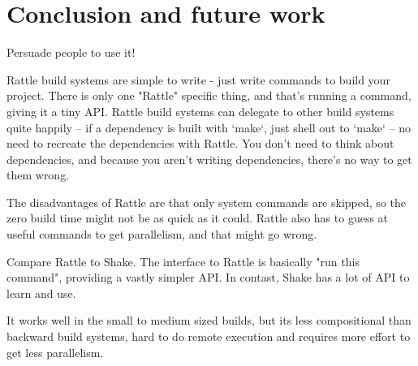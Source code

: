 \section{Conclusion and future work}
\label{sec:conclusion}

Persuade people to use it!

Rattle build systems are simple to write - just write commands to build your project. There is only one "Rattle" specific thing, and that's running a command, giving it a tiny API. Rattle build systems can delegate to other build systems quite happily -- if a dependency is built with `make`, just shell out to `make` -- no need to recreate the dependencies with Rattle. You don't need to think about dependencies, and because you aren't writing dependencies, there's no way to get them wrong.

The disadvantages of Rattle are that only system commands are skipped, so the zero build time might not be as quick as it could. Rattle also has to guess at useful commands to get parallelism, and that might go wrong.

Compare Rattle to Shake. The interface to Rattle is basically "run this command", providing a vastly simpler API. In contast, Shake has a lot of API to learn and use.

It works well in the small to medium sized builds, but its less compositional than backward build systems, hard to do remote execution and requires more effort to get less parallelism.
